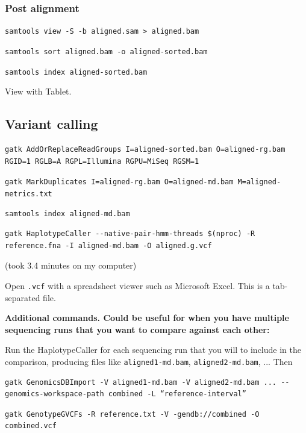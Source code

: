 \documentclass[12pt,letterpaper]{article}
\begin{document}
\subsubsection{Post alignment}

\texttt{samtools view  -S -b aligned.sam > aligned.bam}

\texttt{samtools sort aligned.bam -o aligned-sorted.bam}

\texttt{samtools index aligned-sorted.bam}

View with Tablet.

\subsection{Variant calling}

\begin{verbatim}
gatk AddOrReplaceReadGroups I=aligned-sorted.bam O=aligned-rg.bam RGID=1 RGLB=A RGPL=Illumina RGPU=MiSeq RGSM=1
\end{verbatim}


\texttt{gatk MarkDuplicates I=aligned-rg.bam O=aligned-md.bam M=aligned-metrics.txt}

\texttt{samtools index aligned-md.bam}

\begin{verbatim}
gatk HaplotypeCaller --native-pair-hmm-threads $(nproc) -R reference.fna -I aligned-md.bam -O aligned.g.vcf
\end{verbatim}

(took 3.4 minutes on my computer)

Open \texttt{.vcf} with a spreadsheet viewer such as Microsoft Excel. This is a tab-separated file.

\textbf{Additional commands. Could be useful for when you have multiple sequencing runs that you want to compare against each other:}

Run the HaplotypeCaller for each sequencing run that you will to include in the comparison, producing files like \texttt{aligned1-md.bam}, \texttt{aligned2-md.bam}, ... Then

\begin{verbatim}
gatk GenomicsDBImport -V aligned1-md.bam -V aligned2-md.bam ... --genomics-workspace-path combined -L “reference-interval”
\end{verbatim}

\begin{verbatim}
gatk GenotypeGVCFs -R reference.txt -V -gendb://combined -O combined.vcf
\end{verbatim}
\end{document}
